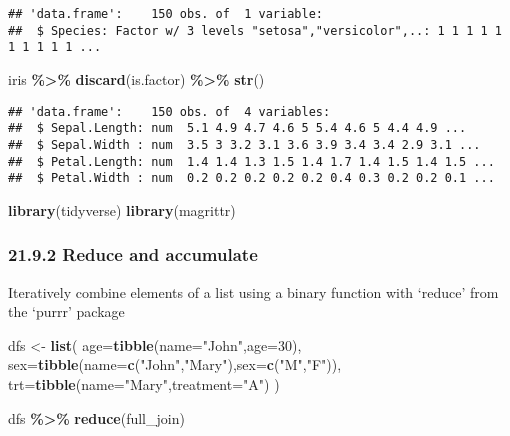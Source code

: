 \documentclass[
]{article}
\newenvironment{Shaded}{\begin{snugshade}}{\end{snugshade}}
\newcommand{\AttributeTok}[1]{\textcolor[rgb]{0.13,0.29,0.53}{#1}}
\newcommand{\DecValTok}[1]{\textcolor[rgb]{0.00,0.00,0.81}{#1}}
\newcommand{\FunctionTok}[1]{\textcolor[rgb]{0.13,0.29,0.53}{\textbf{#1}}}
\newcommand{\NormalTok}[1]{#1}
\newcommand{\OtherTok}[1]{\textcolor[rgb]{0.56,0.35,0.01}{#1}}
\newcommand{\SpecialCharTok}[1]{\textcolor[rgb]{0.81,0.36,0.00}{\textbf{#1}}}
\newcommand{\StringTok}[1]{\textcolor[rgb]{0.31,0.60,0.02}{#1}}
\begin{document}
\begin{verbatim}
## 'data.frame':    150 obs. of  1 variable:
##  $ Species: Factor w/ 3 levels "setosa","versicolor",..: 1 1 1 1 1 1 1 1 1 1 ...
\end{verbatim}

\begin{Shaded}
\begin{Highlighting}[]
\NormalTok{iris }\SpecialCharTok{\%\textgreater{}\%} 
  \FunctionTok{discard}\NormalTok{(is.factor) }\SpecialCharTok{\%\textgreater{}\%}
  \FunctionTok{str}\NormalTok{()}
\end{Highlighting}
\end{Shaded}

\begin{verbatim}
## 'data.frame':    150 obs. of  4 variables:
##  $ Sepal.Length: num  5.1 4.9 4.7 4.6 5 5.4 4.6 5 4.4 4.9 ...
##  $ Sepal.Width : num  3.5 3 3.2 3.1 3.6 3.9 3.4 3.4 2.9 3.1 ...
##  $ Petal.Length: num  1.4 1.4 1.3 1.5 1.4 1.7 1.4 1.5 1.4 1.5 ...
##  $ Petal.Width : num  0.2 0.2 0.2 0.2 0.2 0.4 0.3 0.2 0.2 0.1 ...
\end{verbatim}

\begin{Shaded}
\begin{Highlighting}[]
\FunctionTok{library}\NormalTok{(tidyverse)}
\FunctionTok{library}\NormalTok{(magrittr)}
\end{Highlighting}
\end{Shaded}

\hypertarget{reduce-and-accumulate}{%
\subsubsection{21.9.2 Reduce and
accumulate}\label{reduce-and-accumulate}}

Iteratively combine elements of a list using a binary function with
`reduce' from the `purrr' package

\begin{Shaded}
\begin{Highlighting}[]
\NormalTok{dfs }\OtherTok{\textless{}{-}} \FunctionTok{list}\NormalTok{(}
  \AttributeTok{age=}\FunctionTok{tibble}\NormalTok{(}\AttributeTok{name=}\StringTok{"John"}\NormalTok{,}\AttributeTok{age=}\DecValTok{30}\NormalTok{),}
  \AttributeTok{sex=}\FunctionTok{tibble}\NormalTok{(}\AttributeTok{name=}\FunctionTok{c}\NormalTok{(}\StringTok{"John"}\NormalTok{,}\StringTok{"Mary"}\NormalTok{),}\AttributeTok{sex=}\FunctionTok{c}\NormalTok{(}\StringTok{"M"}\NormalTok{,}\StringTok{"F"}\NormalTok{)),}
  \AttributeTok{trt=}\FunctionTok{tibble}\NormalTok{(}\AttributeTok{name=}\StringTok{"Mary"}\NormalTok{,}\AttributeTok{treatment=}\StringTok{"A"}\NormalTok{)}
\NormalTok{)}

\NormalTok{dfs }\SpecialCharTok{\%\textgreater{}\%} \FunctionTok{reduce}\NormalTok{(full\_join)}
\end{Highlighting}
\end{Shaded}
\end{document}
